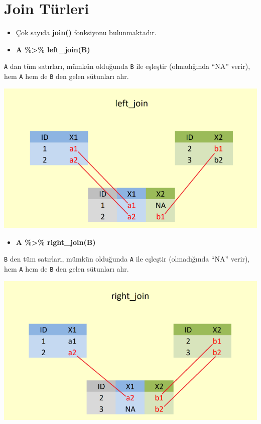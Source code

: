 \documentclass[
  oneside]{book}
\providecommand{\tightlist}{%
  \setlength{\itemsep}{0pt}\setlength{\parskip}{0pt}}
\begin{document}
\hypertarget{join-tuxfcrleri}{%
\section{Join Türleri}\label{join-tuxfcrleri}}

\begin{itemize}
\tightlist
\item
  Çok sayıda \textbf{join()} fonksiyonu bulunmaktadır.
\item
  \textbf{A \%\textgreater\% left\_join(B)}
\end{itemize}

\texttt{A} dan tüm satırları, mümkün olduğunda \texttt{B} ile eşleştir (olmadığında ``NA'' verir), hem \texttt{A} hem de \texttt{B} den gelen sütunları alır.

\begin{center}\includegraphics[width=0.6\linewidth]{images/left_join} \end{center}

\begin{itemize}
\tightlist
\item
  \textbf{A \%\textgreater\% right\_join(B)}
\end{itemize}

\texttt{B} den tüm satırları, mümkün olduğunda \texttt{A} ile eşleştir (olmadığında ``NA'' verir), hem \texttt{A} hem de \texttt{B} den gelen sütunları alır.

\begin{center}\includegraphics[width=0.6\linewidth]{images/right_join} \end{center}
\end{document}

